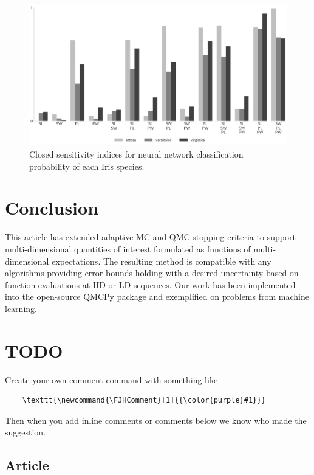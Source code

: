 \documentclass[graybox]{svmult}
\newcommand{\AGSComment}[1]{{\color{brown} #1}}
\newcommand{\FJHComment}[1]{{\color{purple}Fred:  #1}}
\begin{document}
\begin{figure}[t]
    \centering
    \includegraphics[width=.8\textwidth]{figs/nn_si.pdf}
    \caption{Closed sensitivity indices for neural network classification probability of each Iris species.}
    \label{fig:nn_si}
\end{figure}

\section{Conclusion} \label{sec:conclusions}

This article has extended adaptive MC and QMC stopping criteria to support multi-dimensional quantities of interest formulated as functions of multi-dimensional expectations. The resulting method is compatible with any algorithms providing error bounds holding with a desired uncertainty based on function evaluations at IID or LD sequences. Our work has been implemented into the open-source QMCPy package and exemplified on problems from machine learning. 

\printbibliography
% 
% 

\AGSComment{\section*{TODO}}

Create your own comment command with something like
\begin{verbatim}
    \texttt{\newcommand{\FJHComment}[1]{{\color{purple}#1}}}
\end{verbatim} 
Then when you add inline comments or comments below we know who made the suggestion. 

\subsection*{Article}
\end{document}
